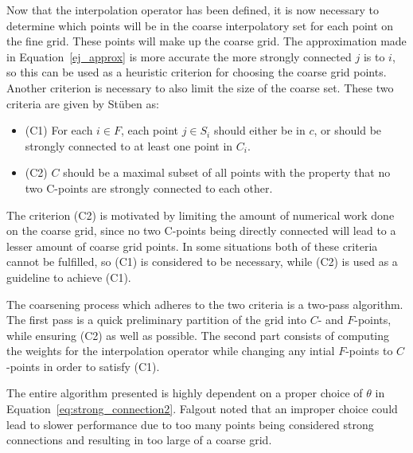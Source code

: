 Now that the interpolation operator has been defined, it is now necessary to determine which points will be in the coarse interpolatory set for each point on the fine grid. These points will make up the coarse grid. The approximation made in Equation~\ref{ej_approx} is more accurate the more strongly connected $j$ is to $i$, so this can be used as a heuristic criterion for choosing the coarse grid points. Another criterion is necessary to also limit the size of the coarse set. These two criteria are given by Stüben as:

\begin{itemize}
	\item (C1) For each $i \in F$, each point $j \in S_i$ should either be in $c$, or should be strongly connected to at least one point in $C_i$.
	\item (C2) $C$ should be a maximal subset of all points with the property that no two C-points are strongly connected to each other.
\end{itemize}

The criterion (C2) is motivated by limiting the amount of numerical work done on the coarse grid, since no two C-points being directly connected will lead to a lesser amount of coarse grid points. In some situations both of these criteria cannot be fulfilled, so (C1) is considered to be necessary, while (C2) is used as a guideline to achieve (C1).

The coarsening process which adheres to the two criteria is a two-pass algorithm. The first pass is a quick preliminary partition of the grid into $C$- and $F$-points, while ensuring (C2) as well as possible. The second part consists of computing the weights for the interpolation operator while changing any intial $F$-points to $C$-points in order to satisfy (C1).


The entire algorithm presented is highly dependent on a proper choice of $\theta$ in Equation~\ref{eq:strong_connection2}. Falgout noted that an improper choice could lead to slower performance due to too many points being considered strong connections and resulting in too large of a coarse grid.

